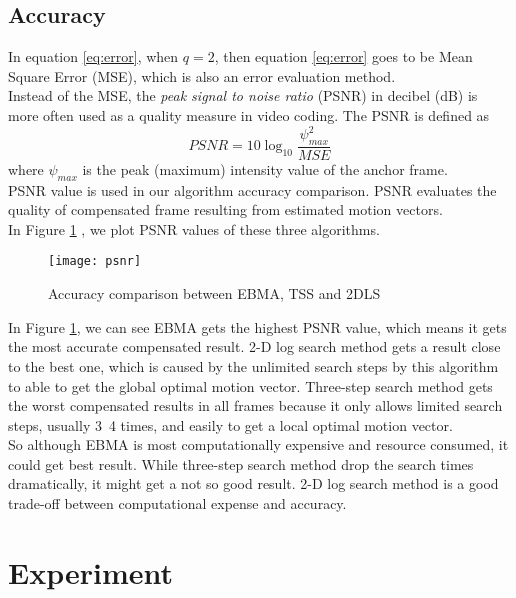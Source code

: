 \documentclass[a4paper, twocolumn]{article}
\begin{document}
	\subsection{Accuracy}
	In equation \ref{eq:error}, when $ q = 2 $, then equation \ref{eq:error} goes to be Mean Square Error (MSE), which is also an error evaluation method. \\
	Instead of the MSE, the \textit{peak signal to noise ratio} (PSNR) in decibel (dB) is more often used as a quality measure in video coding. The PSNR is defined as 
	\begin{equation}
		PSNR = 10 \log_{10} \frac{\psi_{max}^2}{MSE}
	\end{equation}
	where $ \psi_{max} $ is the peak (maximum) intensity value of the anchor frame.\\
	PSNR value is used in our algorithm accuracy comparison. PSNR evaluates the quality of compensated frame resulting from estimated motion vectors. \\
	In Figure \ref{fig:psnr} , we plot PSNR values of these three algorithms. 
	\begin{figure}[h]
	\centering
	\texttt{[image: psnr]}
	\caption{Accuracy comparison between EBMA, TSS and 2DLS}
	\label{fig:psnr}
	\end{figure}

	\noindent
	In Figure \ref{fig:psnr}, we can see EBMA gets the highest PSNR value, which means it gets the most accurate compensated result. 2-D log search method gets a result close to the best one, which is caused by the unlimited search steps by this algorithm to able to get the global optimal motion vector. Three-step search method gets the worst compensated results in all frames because it only allows limited search steps, usually 3~4 times, and easily to get a local optimal motion vector.\\
	So although EBMA is most computationally expensive and resource consumed, it could get best result. While three-step search method drop the search times dramatically, it might get a not so good result. 2-D log search method is a good trade-off between computational expense and accuracy.
	
	
	\section{Experiment}
		
		
	
\end{document}
